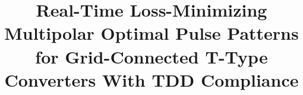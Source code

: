 \documentclass[conference]{IEEEtran}
\newcommand{\upd}[1]{\par\smallskip\noindent{\color{red}\footnotesize
    \textbf{[ACTUALIZAR]} #1}\par\smallskip}
\renewcommand{\upd}[1]{}       %
\begin{document}
\title{
Real-Time Loss-Minimizing Multipolar Optimal Pulse Patterns for
Grid-Connected T-Type Converters With TDD Compliance

}




\maketitle
\upd{Pendiente general: elegir la revista (TPEL, TIE, JESTPE\dots) y su
limite de paginas, y pasar a la clase \texttt{journal} de IEEEtran
(autores, biografias con foto).}
\end{document}
